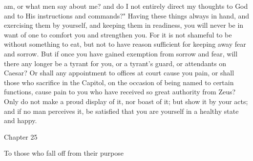 \documentclass[a4paper]{article}
\begin{document}
am, or what men say about me? and do I not entirely direct my thoughts to God
and to His instructions and commands?"
    Having these things always in hand, and exercising them by yourself, and
keeping them in readiness, you will never be in want of one to comfort you and
strengthen you. For it is not shameful to be without something to eat, but not
to have reason sufficient for keeping away fear and sorrow. But if once you
have gained exemption from sorrow and fear, will there any longer be a tyrant
for you, or a tyrant's guard, or attendants on Caesar? Or shall any appointment
to offices at court cause you pain, or shall those who sacrifice in the
Capitol, on the occasion of being named to certain functions, cause pain to you
who have received so great authority from Zeus? Only do not make a proud
display of it, nor boast of it; but show it by your acts; and if no man
perceives it, be satisfied that you are yourself in a healthy state and happy.

Chapter 25

To those who fall off from their purpose
\end{document}
